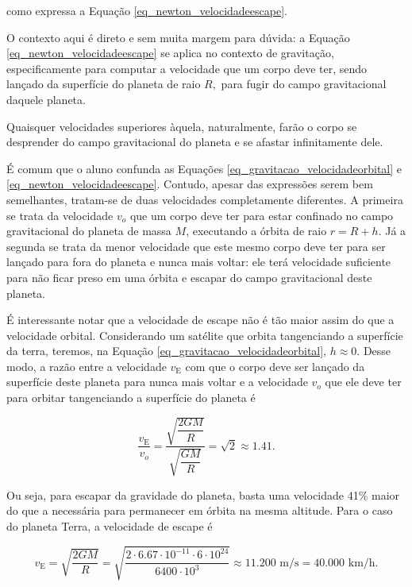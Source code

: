 \noindent como expressa a Equação \eqref{eq_newton_velocidadeescape}.


O contexto aqui é direto e sem muita margem para dúvida: a Equação \eqref{eq_newton_velocidadeescape} se aplica no contexto de gravitação, especificamente para computar a velocidade que um corpo deve ter, sendo lançado da superfície do planeta de raio $R,$ para fugir do campo gravitacional daquele planeta.

Quaisquer velocidades superiores àquela, naturalmente, farão o corpo se desprender do campo gravitacional do planeta e se afastar infinitamente dele.



É comum que o aluno confunda as Equações \eqref{eq_gravitacao_velocidadeorbital} e \eqref{eq_newton_velocidadeescape}. Contudo, apesar das expressões serem bem semelhantes, tratam-se de duas velocidades completamente diferentes. A primeira se trata da velocidade $v_o$ que um corpo deve ter para estar confinado no campo gravitacional do planeta de massa $M$, executando a órbita de raio $r=R+h.$ Já a segunda se trata da menor velocidade que este mesmo corpo deve ter para ser lançado para fora do planeta e nunca mais voltar: ele terá velocidade suficiente para não ficar preso em uma órbita e escapar do campo gravitacional deste planeta.

É interessante notar que a velocidade de escape não é tão maior assim do que a velocidade orbital. Considerando um satélite que orbita tangenciando a superfície da terra, teremos, na Equação \eqref{eq_gravitacao_velocidadeorbital}, $h \approx 0.$ Desse modo, a razão entre a velocidade $v_\text{E}$ com que o corpo deve ser lançado da superfície deste planeta para nunca mais voltar e a velocidade $v_o$ que ele deve ter para orbitar tangenciando a superfície do planeta é

$$ \dfrac{v_\text{E}}{v_o} = \dfrac{\sqrt{ \dfrac{2GM}{R}}}{\sqrt{\dfrac{GM}{R}}} = \sqrt 2 \approx 1.41.$$

Ou seja, para escapar da gravidade do planeta, basta uma velocidade 41\% maior do que a necessária para permanecer em órbita na mesma altitude. Para o caso do planeta Terra, a velocidade de escape é

$$ v_\text{E} = \sqrt{\dfrac{2GM}{R}} = \sqrt{\dfrac{2 \cdot 6.67 \cdot 10^{-11} \cdot 6 \cdot 10^{24}}{6400 \cdot 10^3}} \approx 11.200  \text{ m/s} =  \boxed{40.000 \text{ km/h.}} $$



